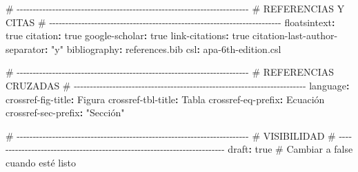 \documentclass[
  doc,
  floatsintext,
  longtable,
  a4paper,
  nolmodern,
  notxfonts,
  notimes,
  12pt,
  colorlinks=true,linkcolor=blue,citecolor=blue,urlcolor=blue]{apa7}
\newenvironment{Shaded}{\begin{snugshade}}{\end{snugshade}}
\newcommand{\AttributeTok}[1]{\textcolor[rgb]{0.40,0.45,0.13}{#1}}
\newcommand{\CharTok}[1]{\textcolor[rgb]{0.13,0.47,0.30}{#1}}
\newcommand{\CommentTok}[1]{\textcolor[rgb]{0.37,0.37,0.37}{#1}}
\newcommand{\FunctionTok}[1]{\textcolor[rgb]{0.28,0.35,0.67}{#1}}
\newcommand{\KeywordTok}[1]{\textcolor[rgb]{0.00,0.23,0.31}{\textbf{#1}}}
\newcommand{\StringTok}[1]{\textcolor[rgb]{0.13,0.47,0.30}{#1}}
\begin{document}
\begin{Shaded}
\begin{Highlighting}[]
\CommentTok{\# {-}{-}{-}{-}{-}{-}{-}{-}{-}{-}{-}{-}{-}{-}{-}{-}{-}{-}{-}{-}{-}{-}{-}{-}{-}{-}{-}{-}{-}{-}{-}{-}{-}{-}{-}{-}{-}{-}{-}{-}{-}{-}{-}{-}{-}{-}{-}{-}{-}{-}{-}{-}{-}{-}{-}{-}{-}{-}{-}{-}{-}{-}{-}{-}{-}{-}{-}{-}{-}{-}{-}{-}}
\CommentTok{\# REFERENCIAS Y CITAS}
\CommentTok{\# {-}{-}{-}{-}{-}{-}{-}{-}{-}{-}{-}{-}{-}{-}{-}{-}{-}{-}{-}{-}{-}{-}{-}{-}{-}{-}{-}{-}{-}{-}{-}{-}{-}{-}{-}{-}{-}{-}{-}{-}{-}{-}{-}{-}{-}{-}{-}{-}{-}{-}{-}{-}{-}{-}{-}{-}{-}{-}{-}{-}{-}{-}{-}{-}{-}{-}{-}{-}{-}{-}{-}{-}}
\FunctionTok{floatsintext}\KeywordTok{:}\AttributeTok{ }\CharTok{true}
\FunctionTok{citation}\KeywordTok{:}\AttributeTok{ }\CharTok{true}
\FunctionTok{google{-}scholar}\KeywordTok{:}\AttributeTok{ }\CharTok{true}
\FunctionTok{link{-}citations}\KeywordTok{:}\AttributeTok{ }\CharTok{true}
\FunctionTok{citation{-}last{-}author{-}separator}\KeywordTok{:}\AttributeTok{ }\StringTok{"y"}
\FunctionTok{bibliography}\KeywordTok{:}\AttributeTok{ references.bib}
\FunctionTok{csl}\KeywordTok{:}\AttributeTok{ apa{-}6th{-}edition.csl}

\CommentTok{\# {-}{-}{-}{-}{-}{-}{-}{-}{-}{-}{-}{-}{-}{-}{-}{-}{-}{-}{-}{-}{-}{-}{-}{-}{-}{-}{-}{-}{-}{-}{-}{-}{-}{-}{-}{-}{-}{-}{-}{-}{-}{-}{-}{-}{-}{-}{-}{-}{-}{-}{-}{-}{-}{-}{-}{-}{-}{-}{-}{-}{-}{-}{-}{-}{-}{-}{-}{-}{-}{-}{-}{-}}
\CommentTok{\# REFERENCIAS CRUZADAS}
\CommentTok{\# {-}{-}{-}{-}{-}{-}{-}{-}{-}{-}{-}{-}{-}{-}{-}{-}{-}{-}{-}{-}{-}{-}{-}{-}{-}{-}{-}{-}{-}{-}{-}{-}{-}{-}{-}{-}{-}{-}{-}{-}{-}{-}{-}{-}{-}{-}{-}{-}{-}{-}{-}{-}{-}{-}{-}{-}{-}{-}{-}{-}{-}{-}{-}{-}{-}{-}{-}{-}{-}{-}{-}{-}}
\FunctionTok{language}\KeywordTok{:}
\AttributeTok{  }\FunctionTok{crossref{-}fig{-}title}\KeywordTok{:}\AttributeTok{ Figura}
\AttributeTok{  }\FunctionTok{crossref{-}tbl{-}title}\KeywordTok{:}\AttributeTok{ Tabla}
\AttributeTok{  }\FunctionTok{crossref{-}eq{-}prefix}\KeywordTok{:}\AttributeTok{ Ecuación}
\AttributeTok{  }\FunctionTok{crossref{-}sec{-}prefix}\KeywordTok{:}\AttributeTok{ }\StringTok{"Sección"}

\CommentTok{\# {-}{-}{-}{-}{-}{-}{-}{-}{-}{-}{-}{-}{-}{-}{-}{-}{-}{-}{-}{-}{-}{-}{-}{-}{-}{-}{-}{-}{-}{-}{-}{-}{-}{-}{-}{-}{-}{-}{-}{-}{-}{-}{-}{-}{-}{-}{-}{-}{-}{-}{-}{-}{-}{-}{-}{-}{-}{-}{-}{-}{-}{-}{-}{-}{-}{-}{-}{-}{-}{-}{-}{-}}
\CommentTok{\# VISIBILIDAD}
\CommentTok{\# {-}{-}{-}{-}{-}{-}{-}{-}{-}{-}{-}{-}{-}{-}{-}{-}{-}{-}{-}{-}{-}{-}{-}{-}{-}{-}{-}{-}{-}{-}{-}{-}{-}{-}{-}{-}{-}{-}{-}{-}{-}{-}{-}{-}{-}{-}{-}{-}{-}{-}{-}{-}{-}{-}{-}{-}{-}{-}{-}{-}{-}{-}{-}{-}{-}{-}{-}{-}{-}{-}{-}{-}}
\FunctionTok{draft}\KeywordTok{:}\AttributeTok{ }\CharTok{true}\CommentTok{            \# Cambiar a false cuando esté listo}


\end{Highlighting}
\end{Shaded}
\end{document}
